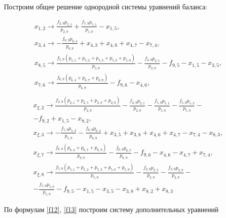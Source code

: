 \documentclass[14pt]{extarticle}%
\begin{document}
Построим общее решение однородной системы уравнений баланса:

\begin{equation*}\begin{gathered}
	x_{1,2}\to \frac{f_{2,9} p_{2,1}}{p_{2,9}}+\frac{f_{5,9} p_{5,1}}{p_{5,9}}-x_{1,5},\\
	x_{3,4}\to -\frac{f_{6,9} p_{6,4}}{p_{6,9}}+x_{4,3}+x_{4,6}+x_{4,7}-x_{7,4},\\
	x_{8,5}\to \frac{f_{5,9} \left(p_{5,1}+p_{5,2}+p_{5,3}+p_{5,8}+p_{5,9}\right)}{p_{5,9}}-\frac{f_{2,9} p_{2,5}}{p_{2,9}}-f_{9,5}-x_{1,5}-x_{3,5},\\
	x_{7,6}\to \frac{f_{6,9} \left(p_{6,4}+p_{6,7}+p_{6,9}\right)}{p_{6,9}}-f_{9,6}-x_{4,6},\\
	\end{gathered}
\end{equation*}\begin{equation*}\begin{gathered}
	x_{\xi,2}\to \frac{f_{2,9} \left(p_{2,1}+p_{2,5}+p_{2,8}+p_{2,9}\right)}{p_{2,9}}-\frac{f_{2,9} p_{2,1}}{p_{2,9}}-\frac{f_{5,9} p_{5,1}}{p_{5,9}}-\frac{f_{5,9} p_{5,2}}{p_{5,9}}-\\-f_{9,2}+x_{1,5}-x_{8,2},\\
	x_{\xi,3}\to -\frac{f_{5,9} p_{5,3}}{p_{5,9}}-\frac{f_{6,9} p_{6,4}}{p_{6,9}}+x_{3,5}+x_{3,8}+x_{4,6}+x_{4,7}-x_{7,4}-x_{8,3},\\
	x_{\xi,7}\to \frac{f_{6,9} \left(p_{6,4}+p_{6,7}+p_{6,9}\right)}{p_{6,9}}-\frac{f_{6,9} p_{6,7}}{p_{6,9}}-f_{9,6}-x_{4,6}-x_{4,7}+x_{7,4},\\
	x_{\xi,8}\to \frac{f_{5,9} \left(p_{5,1}+p_{5,2}+p_{5,3}+p_{5,8}+p_{5,9}\right)}{p_{5,9}}-\frac{f_{2,9} p_{2,5}}{p_{2,9}}-\frac{f_{2,9} p_{2,8}}{p_{2,9}}-\\-\frac{f_{5,9} p_{5,8}}{p_{5,9}}-f_{9,5}-x_{1,5}-x_{3,5}-x_{3,8}+x_{8,2}+x_{8,3}
	\end{gathered}
\end{equation*}

По формулам \eqref{f12}, \eqref{f13} построим систему дополнительных уравнений
\end{document}
